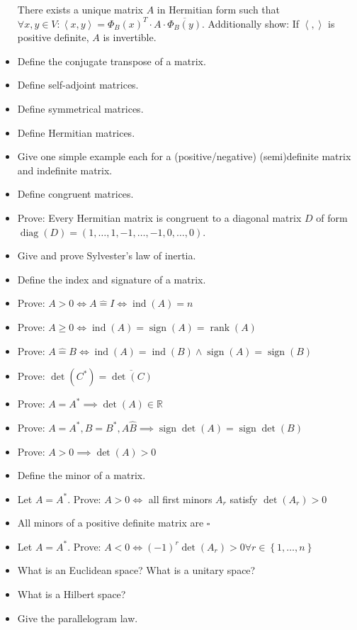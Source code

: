 \documentclass[a4paper]{article}
\newcommand{\set}[1]{\left\{#1\right\}}
\newcommand{\angel}[1]{\left\langle#1\right\rangle}
\DeclareMathOperator{\sign}{sign}
\begin{document}
\begin{itemize}
    There exists a unique matrix $A$ in Hermitian form such that $\forall x,y \in V: \angel{x,y} = \Phi_B(x)^T \cdot A \cdot \overline{\Phi_B(y)}$.
    Additionally show: If $\angel{,}$ is positive definite, $A$ is invertible.
  \item Define the conjugate transpose of a matrix.
  \item Define self-adjoint matrices.
  \item Define symmetrical matrices.
  \item Define Hermitian matrices.
  \item Give one simple example each for a (positive/negative) (semi)definite matrix and indefinite matrix.
  \item Define congruent matrices.
  \item Prove: Every Hermitian matrix is congruent to a diagonal matrix $D$ of form $\operatorname{diag}(D) = (1, \dots, 1, -1, \dots, -1, 0, \dots, 0)$.
  \item Give and prove Sylvester's law of inertia.
  \item Define the index and signature of a matrix.
  \item Prove: $A > 0 \iff A \hat={} I \iff \operatorname{ind}(A) = n$
  \item Prove: $A \geq 0 \iff \operatorname{ind}(A) = \operatorname{sign}(A) = \operatorname{rank}(A)$
  \item Prove: $A \hat={} B \iff \operatorname{ind}(A) = \operatorname{ind}(B) \land \operatorname{sign}(A) = \operatorname{sign}(B)$
  \item Prove: $\det(C^*) = \overline{\det(C)}$
  \item Prove: $A = A^* \implies \det(A) \in \mathbb R$
  \item Prove: $A = A^*, B = B^*, A \hat B \implies \sign{\det(A)} = \sign{\det(B)}$
  \item Prove: $A > 0 \implies \det(A) > 0$
  \item Define the minor of a matrix.
  \item Let $A = A^*$. Prove: $A > 0 \iff$ all first minors $A_r$ satisfy $\det(A_r) > 0$
  \item All minors of a positive definite matrix are $\square$
  \item Let $A = A^*$. Prove: $A < 0 \iff (-1)^r \det(A_r) > 0 \forall r \in \set{1, \dots, n}$
  \item What is an Euclidean space? What is a unitary space?
  \item What is a Hilbert space?
  \item Give the parallelogram law.

\end{itemize}
\end{document}
